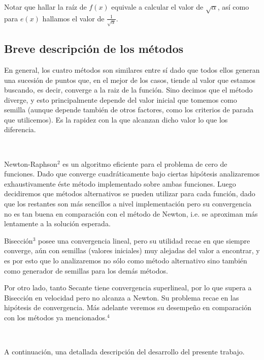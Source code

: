 Notar que hallar la raíz de $f(x)$ equivale a calcular el valor de $\sqrt{\alpha}$, así como para $e(x)$ hallamos el valor de $\displaystyle 
\frac{1}{\sqrt{\alpha}}$.

\subsection{Breve descripción de los métodos}

En general, los cuatro métodos son similares entre sí dado que todos ellos generan una sucesión de puntos que, en el mejor de los casos, tiende al valor que estamos buscando, es decir, converge a la raiz de la función. Sino decimos que el método diverge, y esto principalmente depende del valor inicial que tomemos
como semilla (aunque depende también de otros factores, como los criterios de parada que utilicemos). Es la rapidez con la que alcanzan dicho valor lo que los diferencia.



~

Newton-Raphson$^2$ es un algoritmo eficiente para el problema de cero de funciones. Dado que converge cuadráticamente bajo ciertas hipótesis analizaremos exhaustivamente éste método implementado sobre ambas funciones. Luego decidiremos que métodos alternativos se pueden utilizar para cada función, dado que los restantes son más sencillos a nivel implementación pero su convergencia no es tan buena en comparación con el método de Newton, i.e. se aproximan más lentamente a la solución esperada.

Bisección$^3$ posee una convergencia lineal, pero su utilidad recae en que siempre converge, aún con semillas (valores iniciales) muy alejadas del valor a encontrar, y es por esto que lo analizaremos no sólo como método alternativo sino también como generador de semillas para los demás métodos.

Por otro lado, tanto Secante tiene convergencia superlineal, por lo que supera a Bisección en velocidad pero no alcanza a Newton.
Su problema recae en las hipótesis de convergencia. Más adelante veremos su desempeño en comparación con los métodos ya mencionados.$^4$ 

~

A continuación, una detallada descripción del desarrollo del presente trabajo.
